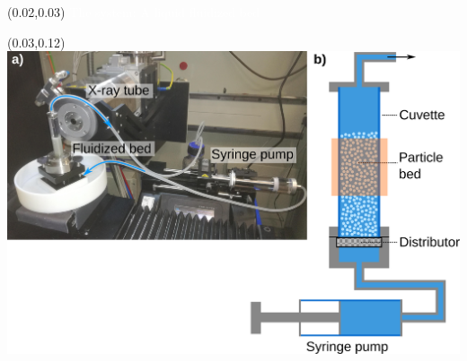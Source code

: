 \begin{frame}[noframenumbering]

\begin{textblock}{0.6}(0.02,0.03)
	\textcolor{white}{
		\Large The system: A liquid fluidized bed}
\end{textblock}

\begin{textblock}{0.6}(0.03,0.12)
	\includegraphics[width=\textwidth]{Sources/X-DFA/experiment-fluidized_bed.pdf}
\end{textblock}




\end{frame}
